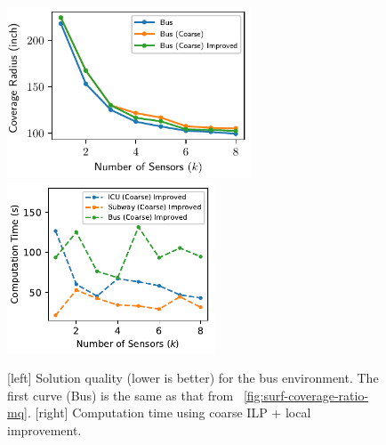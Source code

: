 \begin{figure}[!ht]
    \centering
    \includegraphics[width=.46\columnwidth, height=2in]{chapters/surf/fig/result-bus-mq-eps-converted-to.pdf}
    \includegraphics[width=.46\columnwidth, height=2in]{chapters/surf/fig/result-time-mq-coarse-eps-converted-to.pdf}    
    \caption[Solution quality and computation time for ILP + local improvement on the bus environment]
    { [left] Solution quality (lower is better) for the bus environment. 
    The first curve (Bus) is the same as that from ~\ref{fig:surf-coverage-ratio-mq}. 
    [right] Computation time using coarse ILP + local improvement.}
\label{fig:surf-coverage-ratio-cu}
\end{figure}

